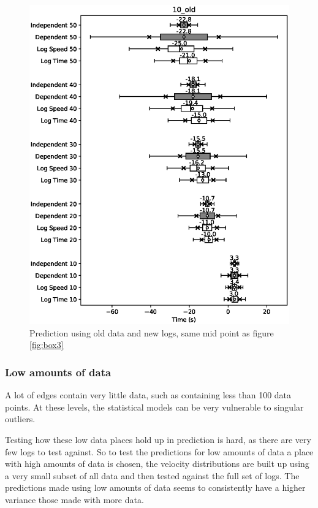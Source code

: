 \documentclass{article}
\begin{document}
				\begin{figure}[H]
					\includegraphics[scale=0.7]{10_old.eps}
					\caption{Prediction using old data and new logs, same mid point as figure \ref{fig:box3}}
					\label{fig:oldWithNew}
				\end{figure}


			\subsubsection{Low amounts of data}
				A lot of edges contain very little data, such as containing less than 100 data points. At these levels, the statistical models can be very vulnerable to singular outliers.

				Testing how these low data places hold up in prediction is hard, as there are very few logs to test against. So to test the predictions for low amounts of data a place with high amounts of data is chosen, the velocity distributions are built up using a very small subset of all data and then tested against the full set of logs. The predictions made using low amounts of data seems to consistently have a higher variance those made with more data.
\end{document}
